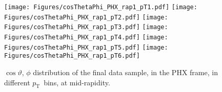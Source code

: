 \documentclass[12pt]{article}
\newcommand{\pt}{$p_{\mathrm{T}}$}
\begin{document}
%
%


\begin{figure}[htbp]
\centering
\texttt{[image: Figures/cosThetaPhi\_PHX\_rap1\_pT1.pdf]}
\texttt{[image: Figures/cosThetaPhi\_PHX\_rap1\_pT2.pdf]}
\texttt{[image: Figures/cosThetaPhi\_PHX\_rap1\_pT3.pdf]}
\texttt{[image: Figures/cosThetaPhi\_PHX\_rap1\_pT4.pdf]}
\texttt{[image: Figures/cosThetaPhi\_PHX\_rap1\_pT5.pdf]}
\texttt{[image: Figures/cosThetaPhi\_PHX\_rap1\_pT6.pdf]}
\caption{$\cos\vartheta,\,\phi$ distribution of the final data sample, 
	in the PHX frame, in different \pt\ bins, at mid-rapidity.}
\end{figure}
\clearpage
\end{document}
